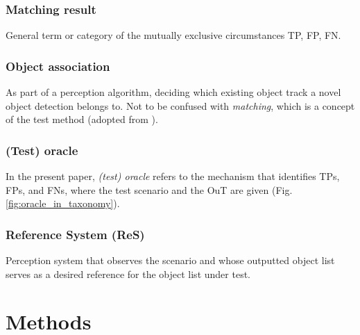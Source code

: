 \documentclass[conference]{IEEEtran}
\begin{document}

\subsubsection{Matching result} \label{def:matching_result} General term or category of the mutually exclusive circumstances TP, FP, FN.  



\subsubsection{Object association} \label{def:association} As part of a perception algorithm, deciding which existing object track a novel object detection belongs to. Not to be confused with \textit{matching}, which is a concept of the test method (adopted from \cite{Luiten2020hota}).

\subsubsection{(Test) oracle} \label{def:oracle} 
In the present paper, \textit{(test) oracle} refers to the mechanism that identifies TPs, FPs, and FNs, where the test scenario and the OuT are given (Fig. \ref{fig:oracle_in_taxonomy}).

\subsubsection{Reference System (ReS)}
\label{def:reference_system}
Perception system that observes the scenario and whose outputted object list serves as a desired reference for the object list under test. 



\section{Methods}
\label{sec:method}
\end{document}
